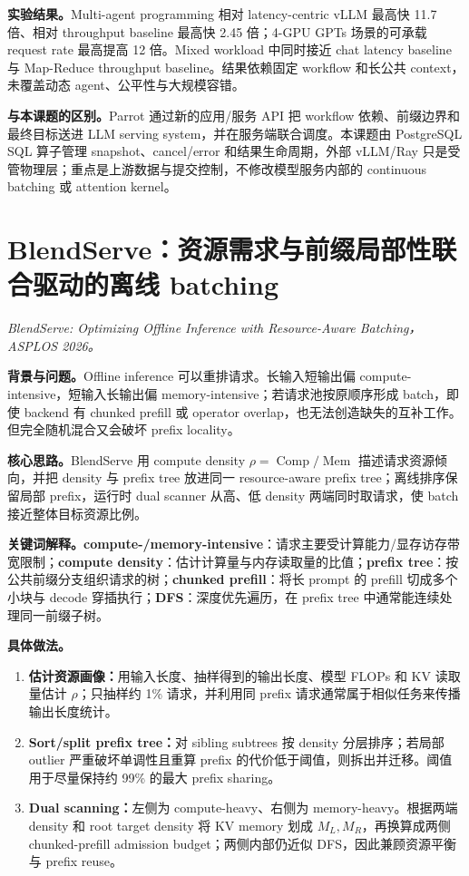 \documentclass[10pt,a4paper]{ctexart}
\let\digestoriginalsection\section
\renewcommand{\section}{\Needspace{7\baselineskip}\digestoriginalsection}
\newcommand{\paperinfo}[1]{\textit{#1}\par}
\newcommand{\field}[1]{\par\noindent\textbf{#1。}\hspace{0.25em}}
\begin{document}
\field{实验结果}Multi-agent programming 相对 latency-centric vLLM 最高快 11.7 倍、相对 throughput baseline 最高快 2.45 倍；4-GPU GPTs 场景的可承载 request rate 最高提高 12 倍。Mixed workload 中同时接近 chat latency baseline 与 Map-Reduce throughput baseline。结果依赖固定 workflow 和长公共 context，未覆盖动态 agent、公平性与大规模容错。

\field{与本课题的区别}Parrot 通过新的应用/服务 API 把 workflow 依赖、前缀边界和最终目标送进 LLM serving system，并在服务端联合调度。本课题由 PostgreSQL SQL 算子管理 snapshot、cancel/error 和结果生命周期，外部 vLLM/Ray 只是受管物理层；重点是上游数据与提交控制，不修改模型服务内部的 continuous batching 或 attention kernel。

\section{BlendServe：资源需求与前缀局部性联合驱动的离线 batching}
\paperinfo{BlendServe: Optimizing Offline Inference with Resource-Aware Batching，ASPLOS 2026。}

\field{背景与问题}Offline inference 可以重排请求。长输入短输出偏 compute-intensive，短输入长输出偏 memory-intensive；若请求池按原顺序形成 batch，即使 backend 有 chunked prefill 或 operator overlap，也无法创造缺失的互补工作。但完全随机混合又会破坏 prefix locality。

\field{核心思路}BlendServe 用 compute density $\rho=\operatorname{Comp}/\operatorname{Mem}$ 描述请求资源倾向，并把 density 与 prefix tree 放进同一 resource-aware prefix tree；离线排序保留局部 prefix，运行时 dual scanner 从高、低 density 两端同时取请求，使 batch 接近整体目标资源比例。

\field{关键词解释}\textbf{compute-/memory-intensive}：请求主要受计算能力/显存访存带宽限制；\textbf{compute density}：估计计算量与内存读取量的比值；\textbf{prefix tree}：按公共前缀分支组织请求的树；\textbf{chunked prefill}：将长 prompt 的 prefill 切成多个小块与 decode 穿插执行；\textbf{DFS}：深度优先遍历，在 prefix tree 中通常能连续处理同一前缀子树。

\field{具体做法}
\begin{enumerate}
  \item \textbf{估计资源画像：}用输入长度、抽样得到的输出长度、模型 FLOPs 和 KV 读取量估计 $\rho$；只抽样约 1\% 请求，并利用同 prefix 请求通常属于相似任务来传播输出长度统计。
  \item \textbf{Sort/split prefix tree：}对 sibling subtrees 按 density 分层排序；若局部 outlier 严重破坏单调性且重算 prefix 的代价低于阈值，则拆出并迁移。阈值用于尽量保持约 99\% 的最大 prefix sharing。
  \item \textbf{Dual scanning：}左侧为 compute-heavy、右侧为 memory-heavy。根据两端 density 和 root target density 将 KV memory 划成 $M_L,M_R$，再换算成两侧 chunked-prefill admission budget；两侧内部仍近似 DFS，因此兼顾资源平衡与 prefix reuse。
\end{enumerate}
\end{document}
